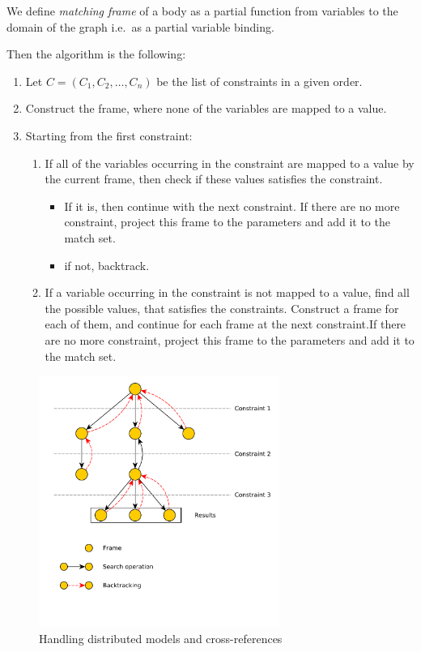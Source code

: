 We define \emph{matching frame} of a body as a partial function from variables to the domain of the graph i.e.\ as a partial variable binding.

Then the algorithm is the following:
\begin{enumerate}
	
\item
Let $C = (C_1, C_2, \dots{}, C_n )$ be the list of constraints in a given order.

\item 
Construct the frame, where none of the variables are mapped to a value.

\item 
Starting from the first constraint:
	\begin{enumerate}
		\item 
		If all of the variables occurring in the constraint are mapped to a value by the current frame, then check if these values satisfies the constraint. 
		\begin{itemize}
			\item If it is, then continue with the next constraint. If there are no more constraint, project this frame to the parameters and add it to the match set.
			\item if not, backtrack.
		\end{itemize}
		
		\item 
		If a variable occurring in the constraint is not mapped to a value, find all the possible values, that satisfies the constraints.
		Construct a frame for each of them, and continue for each frame at the next constraint.If there are no more constraint, project this frame to the parameters and add it to the match set.	
	\end{enumerate}	
\end{enumerate}
	
	
\begin{figure}[h]
	\begin{center}
		\includegraphics[width=0.7\textwidth]{figures/localsearch.pdf}
		\caption{Handling distributed models and cross-references}
		\label{fig:localsearch}
	\end{center}
\end{figure}
	
